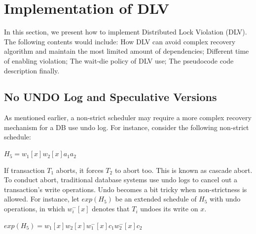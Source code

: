 \documentclass[conference]{IEEEtran}
\begin{document}


\section{Implementation of DLV}
\label{sec:implement}

In this section, we present how to implement Distributed Lock Violation (DLV).
The following contents would include:
How DLV can avoid complex recovery algorithm and maintain the most limited amount of dependencies;
Different time of enabling violation;
The wait-die policy of DLV use;
The pseudocode code description finally.

\subsection {No UNDO Log and Speculative Versions}

As mentioned earlier, a non-strict scheduler may require a more complex recovery mechanism for a DB use undo log.
For instance, consider the following non-strict schedule:

\begin{center}
${H_5 = w_1[x]w_2[x]a_1a_2}$
\end{center}

If transaction ${T_1}$ aborts, it forces ${T_2}$ to abort too.
This is known as cascade abort.
To conduct abort, traditional database systems use undo logs to cancel out a transaction's write operations.
Undo becomes a bit tricky when non-strictness is allowed.
For instance, let ${exp(H_5)}$ be an extended schedule of $H_5$ with undo operations,
in which ${w^-_i[x]}$ denotes that ${T_i}$ undoes its write on ${x}$.


\begin{center}
  ${exp(H_5) =  w_1[x]w_2[x]w^-_1[x]c_1w^-_2[x]c_2}$
\end{center}
\end{document}
